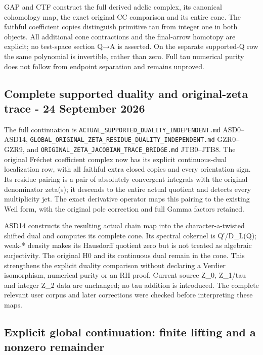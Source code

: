 GAP and CTF construct the full derived adelic complex, its canonical
cohomology map, the exact original CC comparison and its entire cone.
The faithful coefficient copies distinguish primitive tau from integer
one in both objects. All additional cone contractions and the
final-arrow homotopy are explicit; no test-space section Q→A is
asserted. On the separate supported-Q row the same polynomial is
invertible, rather than zero. Full tau numerical purity does not follow
from endpoint separation and remains unproved.

\subsection{Complete supported duality and original-zeta trace - 24
September
2026}\label{complete-supported-duality-and-original-zeta-trace---24-september-2026-occurrence-2}

The full continuation is \nolinkurl{ACTUAL_SUPPORTED_DUALITY_INDEPENDENT.md}
ASD0--ASD14, \nolinkurl{GLOBAL_ORIGINAL_ZETA_RESIDUE_DUALITY_INDEPENDENT.md}
GZR0--GZR9, and \nolinkurl{ORIGINAL_ZETA_JACOBIAN_TRACE_BRIDGE.md} JTB0--JTB8.
The original Fréchet coefficient complex now has its explicit
continuous-dual localization row, with all faithful extra closed copies
and every orientation sign. Its residue pairing is a pair of absolutely
convergent integrals with the original denominator zeta(s); it descends
to the entire actual quotient and detects every multiplicity jet. The
exact derivative operator maps this pairing to the existing Weil form,
with the original pole correction and full Gamma factors retained.

ASD14 constructs the resulting actual chain map into the
character-a-twisted shifted dual and computes its complete cone. Its
spectral cokernel is Q′/D\_L(Q); weak-* density makes its Hausdorff
quotient zero but is not treated as algebraic surjectivity. The original
H0 and its continuous dual remain in the cone. This strengthens the
explicit duality comparison without declaring a Verdier isomorphism,
numerical purity or an RH proof. Current source Z\_0, Z\_1/tau and
integer Z\_2 data are unchanged; no tau addition is introduced. The
complete relevant user corpus and later corrections were checked before
interpreting these maps.

\subsection{Explicit global continuation: finite lifting and a nonzero
remainder}\label{explicit-global-continuation-finite-lifting-and-a-nonzero-remainder-occurrence-4}

